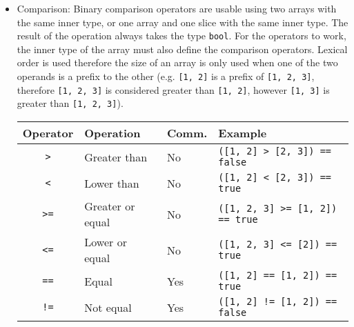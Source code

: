 \begin{itemize}
  The operator \texttt{\~} was selected to avoid confusion with the \texttt{+}
  that would have different behavior depending on the operands. Concatenation is
  not really a math operation, as \texttt{+} would preferably refer to an
  addition of all the inner values of two arrays, more than to their
  concatenation.

  Concatenation operator is obviously not commutative.

  \begin{lstlisting}[style=coloredverbatim]
let a : [i32 ; 3] = [1, 2, 3];
let b : [i32 ; 2] = [4, 5];

let c : [i32 ; 5] = a ~ b;

assert (c == [1, 2, 3, 4, 5]);
  \end{lstlisting}

\item Comparison: Binary comparison operators are usable using two arrays with
  the same inner type, or one array and one slice with the same inner type. The
  result of the operation always takes the type \texttt{bool}. For the operators
  to work, the inner type of the array must also define the comparison
  operators. Lexical order is used therefore the size of an array is only used
  when one of the two operands is a prefix to the other (e.g. \texttt{[1, 2]} is
  a prefix of \texttt{[1, 2, 3]}, therefore \texttt{[1, 2, 3]} is considered
  greater than \texttt{[1, 2]}, however \texttt{[1, 3]} is greater than
  \texttt{[1, 2, 3]}).

  \vspace{-20pt}%
  \begin{center}\begin{adjustbox}{max width=1.0\linewidth}
    \begin{tabular}{|c|lll|}
      \hline
      Operator & Operation & Comm. & Example\\
      \hline
      \hline
      \texttt{>}      & Greater than     & No          & \texttt{([1, 2] > [2, 3]) == false}    \\
      \texttt{<}      & Lower than       & No          & \texttt{([1, 2] < [2, 3]) == true}     \\
      \texttt{>=}     & Greater or equal & No          & \texttt{([1, 2, 3] >= [1, 2]) == true} \\
      \texttt{<=}     & Lower or equal   & No          & \texttt{([1, 2, 3] <= [2]) == true}    \\
      \texttt{==}     & Equal            & Yes         & \texttt{([1, 2] == [1, 2]) == true}    \\
      \texttt{!=}     & Not equal        & Yes         & \texttt{([1, 2] != [1, 2]) == false}   \\
      \hline
    \end{tabular}
  \end{adjustbox}\end{center}


\end{itemize}
